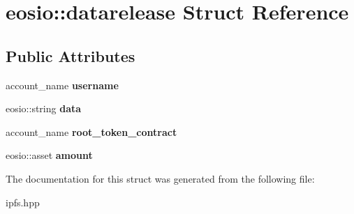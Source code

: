 \hypertarget{structeosio_1_1datarelease}{}\section{eosio\+:\+:datarelease Struct Reference}
\label{structeosio_1_1datarelease}
\subsection*{Public Attributes}
\begin{DoxyCompactItemize}
\item 
\mbox{\label{structeosio_1_1datarelease_a92deb7643fffac9496d14753956b95cc}} 
account\+\_\+name {\bfseries username}
\item 
\mbox{\label{structeosio_1_1datarelease_a44f963f90133c21ded5b1a5efd8bcc49}} 
eosio\+::string {\bfseries data}
\item 
\mbox{\label{structeosio_1_1datarelease_a27dc5b2c43416263fca2580938ca2b17}} 
account\+\_\+name {\bfseries root\+\_\+token\+\_\+contract}
\item 
\mbox{\label{structeosio_1_1datarelease_abebd9d74b9410b647c6761c294b41910}} 
eosio\+::asset {\bfseries amount}
\end{DoxyCompactItemize}


The documentation for this struct was generated from the following file\+:\begin{DoxyCompactItemize}
\item 
ipfs.\+hpp\end{DoxyCompactItemize}
